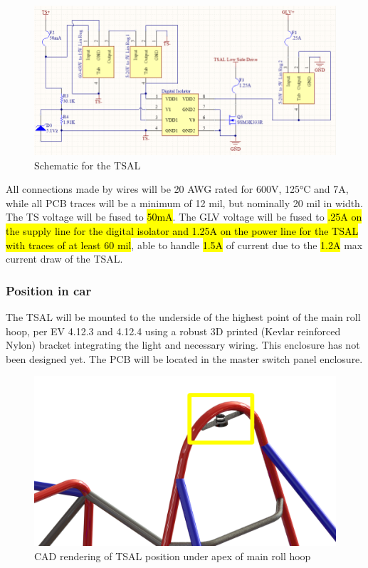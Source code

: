 \documentclass{article}
\begin{document}
\begin{figure}[H]
\centering
\includegraphics[scale=.7]{TSAL.png}
\caption{Schematic for the TSAL}
\label{fig:TSALcircuit}
\end{figure}

All connections made by wires will be 20 AWG rated for 600V, 125°C and 7A, while all PCB traces will be a minimum of 12 mil, but nominally 20 mil in width. The TS voltage will be fused to \hl{50mA}. The GLV voltage will be fused to \hl{.25A on the supply line for the digital isolator and 1.25A on the power line for the TSAL with traces of at least 60 mil}, able to handle \hl{1.5A} of current due to the \hl{1.2A} max current draw of the TSAL.

\subsubsection{Position in car}
The TSAL will be mounted to the underside of the highest point of the main roll hoop, per EV 4.12.3 and 4.12.4 using a robust 3D printed (Kevlar reinforced Nylon) bracket integrating the light and necessary wiring. This enclosure has not been designed yet. The PCB will be located in the master switch panel enclosure.

\begin{figure}[H]
\centering
\includegraphics[scale=1]{TSAL_mounting.png}
\caption{CAD rendering of TSAL position under apex of main roll hoop}
\end{figure}
\end{document}
